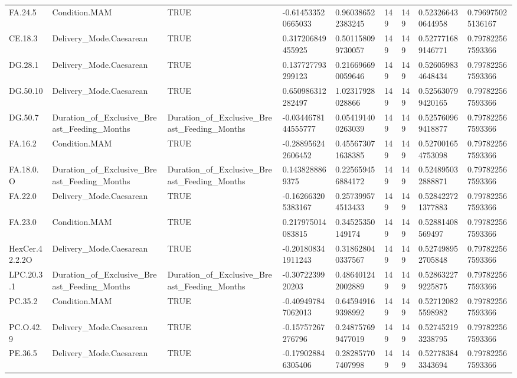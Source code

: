 \begin{longtable}{lllllllll}
FA.24.5 & Condition.MAM & TRUE & -0.614533520665033 & 0.960386522383245 & 149 & 149 & 0.523266430644958 & 0.796975025136167 \\
CE.18.3 & Delivery\_Mode.Caesarean & TRUE & 0.317206849455925 & 0.501158099730057 & 149 & 149 & 0.527771689146771 & 0.797822567593366 \\
DG.28.1 & Delivery\_Mode.Caesarean & TRUE & 0.137727793299123 & 0.216696690059646 & 149 & 149 & 0.526059834648434 & 0.797822567593366 \\
DG.50.10 & Delivery\_Mode.Caesarean & TRUE & 0.650986312282497 & 1.02317928028866 & 149 & 149 & 0.525630799420165 & 0.797822567593366 \\
DG.50.7 & Duration\_of\_Exclusive\_Breast\_Feeding\_Months & Duration\_of\_Exclusive\_Breast\_Feeding\_Months & -0.0344678144555777 & 0.054191400263039 & 149 & 149 & 0.525760969418877 & 0.797822567593366 \\
FA.16.2 & Condition.MAM & TRUE & -0.288956242606452 & 0.455673071638385 & 149 & 149 & 0.527001654753098 & 0.797822567593366 \\
FA.18.0.O & Duration\_of\_Exclusive\_Breast\_Feeding\_Months & Duration\_of\_Exclusive\_Breast\_Feeding\_Months & 0.1438288869375 & 0.225659456884172 & 149 & 149 & 0.524895032888871 & 0.797822567593366 \\
FA.22.0 & Delivery\_Mode.Caesarean & TRUE & -0.162663205383167 & 0.257399574513433 & 149 & 149 & 0.528422721377883 & 0.797822567593366 \\
FA.23.0 & Condition.MAM & TRUE & 0.217975014083815 & 0.34525350149174 & 149 & 149 & 0.52881408569497 & 0.797822567593366 \\
HexCer.42.2.2O & Delivery\_Mode.Caesarean & TRUE & -0.201808341911243 & 0.318628040337567 & 149 & 149 & 0.527498952705848 & 0.797822567593366 \\
LPC.20.3.1 & Duration\_of\_Exclusive\_Breast\_Feeding\_Months & Duration\_of\_Exclusive\_Breast\_Feeding\_Months & -0.3072239920203 & 0.486401242002889 & 149 & 149 & 0.528632279225875 & 0.797822567593366 \\
PC.35.2 & Condition.MAM & TRUE & -0.409497847062013 & 0.645949169398992 & 149 & 149 & 0.527120825598982 & 0.797822567593366 \\
PC.O.42.9 & Delivery\_Mode.Caesarean & TRUE & -0.15757267276796 & 0.248757699477019 & 149 & 149 & 0.527452193238795 & 0.797822567593366 \\
PE.36.5 & Delivery\_Mode.Caesarean & TRUE & -0.179028846305406 & 0.282857707407998 & 149 & 149 & 0.527783843343694 & 0.797822567593366 \\

\end{longtable}
